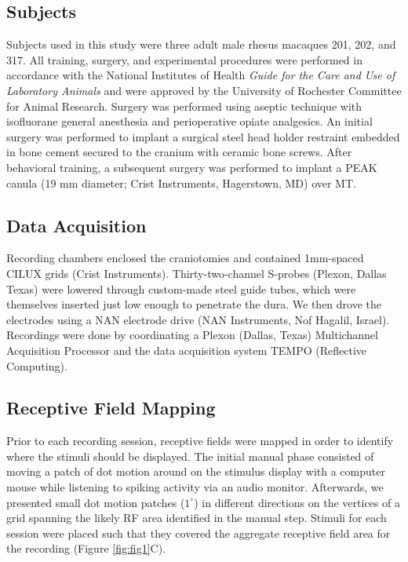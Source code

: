 \subsection*{Subjects} 
Subjects used in this study were three adult male rhesus macaques 201, 202, and 317. All training, surgery, and experimental procedures were performed in accordance with the National Institutes of Health \textit{Guide for the Care and Use of Laboratory Animals} and were approved by the University of Rochester Committee for Animal Research. Surgery was performed using aseptic technique with isofluorane general anesthesia and perioperative opiate analgesics. An initial surgery was performed to implant a surgical steel head holder restraint embedded in bone cement secured to the cranium with ceramic bone screws. After behavioral training, a subsequent surgery was performed to implant a PEAK canula (19 mm diameter; Crist Instruments, Hagerstown, MD) over MT.

\subsection*{Data Acquisition} 
Recording chambers enclosed the craniotomies and contained 1mm-spaced CILUX grids (Crist Instruments). Thirty-two-channel S-probes (Plexon, Dallas Texas) were lowered through custom-made steel guide tubes, which were themselves inserted just low enough to penetrate the dura. We then drove the electrodes using a NAN electrode drive (NAN Instruments, Nof Hagalil, Israel). Recordings were done by coordinating a Plexon (Dallas, Texas) Multichannel Acquisition Processor and the data acquisition system TEMPO (Reflective Computing).

\subsection*{Receptive Field Mapping}
Prior to each recording session, receptive fields were mapped in order to identify where the stimuli should be displayed. The initial manual phase consisted of moving a patch of dot motion around on the stimulus display with a computer mouse while listening to spiking activity via an audio monitor. Afterwards, we presented small dot motion patches ($1^{\circ}$) in different directions on the vertices of a grid spanning the likely RF area identified in the manual step. Stimuli for each session were placed such that they covered the aggregate receptive field area for the recording (Figure \ref{fig:fig1}C).

